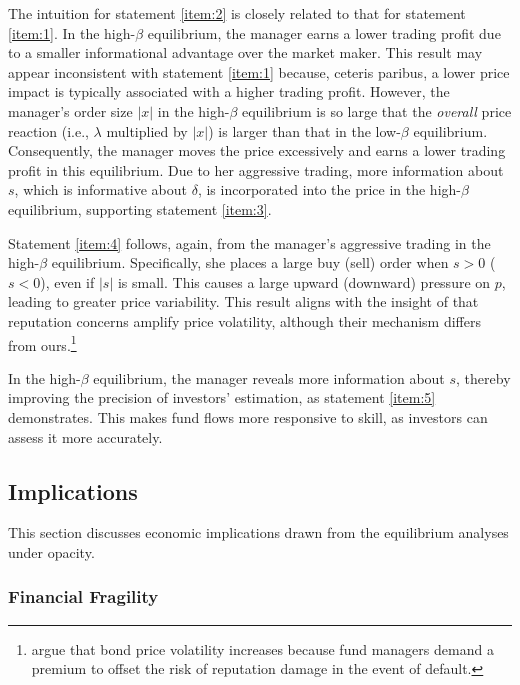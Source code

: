 The intuition for statement \ref{item:2} is closely related to that for statement \ref{item:1}. In the high-$\beta$ equilibrium, the manager earns a lower trading profit due to a smaller informational advantage over the market maker. This result may appear inconsistent with statement \ref{item:1} because, ceteris paribus, a lower price impact is typically associated with a higher trading profit. However, the manager's order size $|x|$ in the high-$\beta$ equilibrium is so large that the {\it overall} price reaction (i.e., $\lambda$ multiplied by $|x|$) is larger than that in the low-$\beta$ equilibrium. Consequently, the manager moves the price excessively and earns a lower trading profit in this equilibrium.
Due to her aggressive trading, more information about $s$, which is informative about $\delta$, is incorporated into the price in the high-$\beta$ equilibrium, supporting statement \ref{item:3}.

Statement \ref{item:4} follows, again, from the manager's aggressive trading in the high-$\beta$ equilibrium. Specifically, she places a large buy (sell) order when $s>0$ ($s<0$), even if $|s|$ is small. This causes a large upward (downward) pressure on $p$, leading to greater price variability. This result aligns with the insight of \citet{guerrieri2012fund} that reputation concerns amplify price volatility, although their mechanism differs from ours.\footnote{\citet{guerrieri2012fund} argue that bond price volatility increases because fund managers demand a premium to offset the risk of reputation damage in the event of default.}

In the high-$\beta$ equilibrium, the manager reveals more information about $s$, thereby improving the precision of investors' estimation, as statement \ref{item:5} demonstrates. This makes fund flows more responsive to skill, as investors can assess it more accurately.

\subsection{Implications}\label{ss:implications}
This section discusses economic implications drawn from the equilibrium analyses under opacity.
\subsubsection{Financial Fragility}

